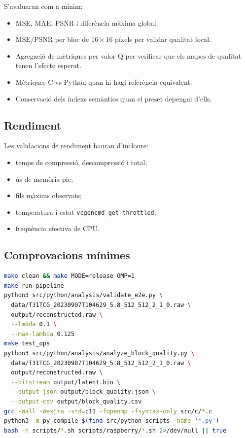 \documentclass[11pt,a4paper]{article}
\begin{document}
S'avaluaran com a mínim:
\begin{itemize}
  \item MSE, MAE, PSNR i diferència màxima global.
  \item MSE/PSNR per bloc de $16 \times 16$ píxels per validar qualitat local.
  \item Agregació de mètriques per valor Q per verificar que els mapes de qualitat tenen l'efecte esperat.
  \item Mètriques C vs Python quan hi hagi referència equivalent.
  \item Conservació dels índexs semàntics quan el preset depengui d'ells.
\end{itemize}

\subsection{Rendiment}

Les validacions de rendiment hauran d'incloure:
\begin{itemize}
  \item temps de compressió, descompressió i total;
  \item ús de memòria pic;
  \item fils màxims observats;
  \item temperatura i estat \texttt{vcgencmd get\_throttled};
  \item freqüència efectiva de CPU.
\end{itemize}

\subsection{Comprovacions mínimes}

\begin{lstlisting}[language=bash]
make clean && make MODE=release OMP=1
make run_pipeline
python3 src/python/analysis/validate_e2e.py \
  data/T31TCG_20230907T104629_5.8_512_512_2_1_0.raw \
  output/reconstructed.raw \
  --lmbda 0.1 \
  --max-lambda 0.125
make test_ops
python3 src/python/analysis/analyze_block_quality.py \
  data/T31TCG_20230907T104629_5.8_512_512_2_1_0.raw \
  output/reconstructed.raw \
  --bitstream output/latent.bin \
  --output-json output/block_quality.json \
  --output-csv output/block_quality.csv
gcc -Wall -Wextra -std=c11 -fopenmp -fsyntax-only src/c/*.c
python3 -m py_compile $(find src/python scripts -name '*.py')
bash -n scripts/*.sh scripts/raspberry/*.sh 2>/dev/null || true
\end{lstlisting}
\end{document}
